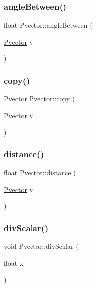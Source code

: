 \mbox{\label{class_pvector_a7c57bb4e92a54b9d3ebb7f2c4c13743f}} 
\subsubsection{\texorpdfstring{angle\+Between()}{angleBetween()}}
{\footnotesize\ttfamily float Pvector\+::angle\+Between (\begin{DoxyParamCaption}\item[{\hyperlink{class_pvector}{Pvector}}]{v }\end{DoxyParamCaption})}

\mbox{\label{class_pvector_af5e109a5f1261c4ee69b6f213d7d6154}} 
\subsubsection{\texorpdfstring{copy()}{copy()}}
{\footnotesize\ttfamily \hyperlink{class_pvector}{Pvector} Pvector\+::copy (\begin{DoxyParamCaption}\item[{\hyperlink{class_pvector}{Pvector}}]{v }\end{DoxyParamCaption})}

\mbox{\label{class_pvector_ad756657de9657b79cf6889ca3161c64e}} 
\subsubsection{\texorpdfstring{distance()}{distance()}}
{\footnotesize\ttfamily float Pvector\+::distance (\begin{DoxyParamCaption}\item[{\hyperlink{class_pvector}{Pvector}}]{v }\end{DoxyParamCaption})}

\mbox{\label{class_pvector_a3d60b718b1d2434e52e45a83ea568baf}} 
\subsubsection{\texorpdfstring{div\+Scalar()}{divScalar()}}
{\footnotesize\ttfamily void Pvector\+::div\+Scalar (\begin{DoxyParamCaption}\item[{float}]{x }\end{DoxyParamCaption})}

